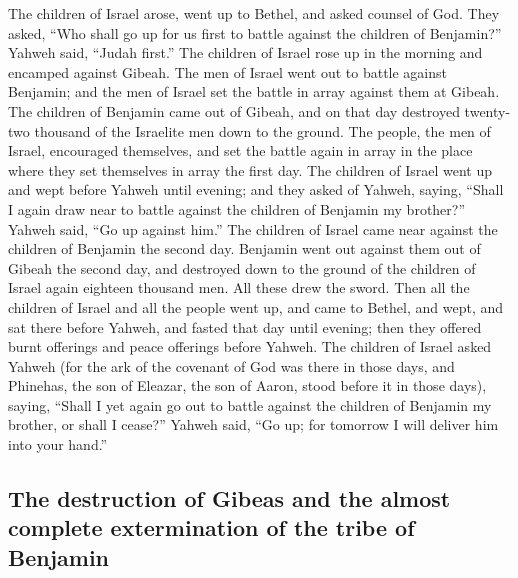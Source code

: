 The children of Israel arose, went up to Bethel, and
asked counsel of God. They asked, ``Who shall go up for us first to
battle against the children of Benjamin?'' Yahweh said, ``Judah first.''
 The children of Israel rose up in the morning and
encamped against Gibeah.  The men of Israel went out to
battle against Benjamin; and the men of Israel set the battle in array
against them at Gibeah.  The children of Benjamin came
out of Gibeah, and on that day destroyed twenty-two thousand of the
Israelite men down to the ground.  The people, the men of
Israel, encouraged themselves, and set the battle again in array in the
place where they set themselves in array the first day. 
The children of Israel went up and wept before Yahweh until evening; and
they asked of Yahweh, saying, ``Shall I again draw near to battle
against the children of Benjamin my brother?'' Yahweh said, ``Go up
against him.''  The children of Israel came near against
the children of Benjamin the second day.  Benjamin went
out against them out of Gibeah the second day, and destroyed down to the
ground of the children of Israel again eighteen thousand men. All these
drew the sword.  Then all the children of Israel and all
the people went up, and came to Bethel, and wept, and sat there before
Yahweh, and fasted that day until evening; then they offered burnt
offerings and peace offerings before Yahweh.  The
children of Israel asked Yahweh (for the ark of the covenant of God was
there in those days,  and Phinehas, the son of Eleazar,
the son of Aaron, stood before it in those days), saying, ``Shall I yet
again go out to battle against the children of Benjamin my brother, or
shall I cease?'' Yahweh said, ``Go up; for tomorrow I will deliver him
into your hand.''

\hypertarget{the-destruction-of-gibeas-and-the-almost-complete-extermination-of-the-tribe-of-benjamin}{%
\subsection{The destruction of Gibeas and the almost complete
extermination of the tribe of
Benjamin}\label{the-destruction-of-gibeas-and-the-almost-complete-extermination-of-the-tribe-of-benjamin}}

